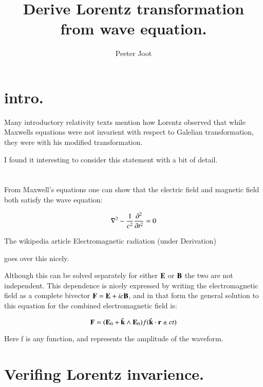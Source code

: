 \documentclass{article}      %
\title{Derive Lorentz transformation from wave equation.} %
\author{Peeter Joot}         %
\newcommand{\laplacian}[0]{\nabla^2}
\begin{document}

\maketitle{}

\section{intro.}

Many introductory relativity texts mention how Lorentz observed that 
while Maxwells equations were not invarient with respect to Galelian
transformation, they were with his modified transformation.

I found it interesting to consider this statement with a bit of detail.

\section{}

From Maxwell's equations one can show that the electric field and magnetic field both satisfy the wave equation:

\begin{equation}
\laplacian - \inv{c^2}\frac{\partial^2}{\partial t^2} = 0 
\end{equation}

The wikipedia article Electromagnetic radiation (under Derivation)


goes over this nicely.

Although this can be solved separately for either $\mathbf{E}$ or $\mathbf{B}$ the two are not independent.
This dependence is nicely expressed by writing the electromagnetic field as a complete
bivector $\mathbf{F} = \mathbf{E} + i c \mathbf{B}$, and in that form the 
general solution to this equation for the combined electromagnetic
field is:

\begin{equation}
\mathbf{F} = (\mathbf{E}_0 + \hat{\mathbf{k}} \wedge \mathbf{E}_0) f( \hat{\mathbf{k}} \cdot \mathbf{r} \pm c t)
\end{equation}

Here f is any function, and represents the amplitude of the waveform.

\section{Verifing Lorentz invarience.}
\end{document}
